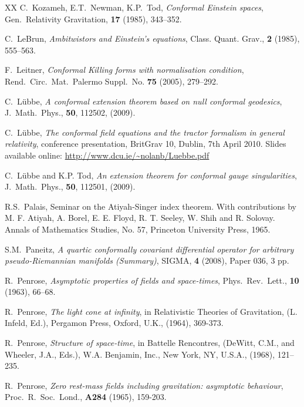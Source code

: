 \documentclass[a4paper,12pt]{amsart}
\theoremstyle{remark}
\begin{document}
\begin{thebibliography}{XX}
 C.\ Kozameh, E.T.\ Newman, K.P.\ Tod, {\em Conformal
  Einstein spaces}, Gen.\ Relativity Gravitation, {\bf 17} (1985),
  343--352.

 C.\ LeBrun, {\em Ambitwistors and Einstein's equations}, 
		Class. Quant. Grav., {\bf 2} (1985), 555--563.

 F.\ Leitner, {\em Conformal Killing forms with
		normalisation condition}, Rend.\ Circ.\ Mat.\ Palermo
		Suppl.\ No. {\bf 75} (2005),  279--292.

 C.\ L\"ubbe, {\em A conformal extension theorem based
  on null conformal geodesics}, J.\ Math.\ Phys., {\bf 50}, 112502,
  (2009).

 C.\ L\"ubbe, {\em The conformal field equations
  and the tractor formalism in general relativity}, conference
  presentation, BritGrav 10, Dublin, 7th April 2010. Slides available
  online: \url{http://www.dcu.ie/~nolanb/Luebbe.pdf}

 C.\ L\"ubbe and K.P. Tod, {\em An extension
  theorem for conformal gauge singularities}, J.\ Math.\ Phys., {\bf 50},
  112501, (2009).


 R.S.\ Palais, Seminar on the Atiyah-Singer index
  theorem. With contributions by M. F. Atiyah, A. Borel, E. E. Floyd,
  R. T. Seeley, W. Shih and R. Solovay. Annals of Mathematics Studies,
  No. 57, Princeton University Press, 1965.

 S.M.\ Paneitz, {\em A quartic conformally covariant
  differential operator for arbitrary pseudo-Riemannian manifolds
  (Summary)}, SIGMA, {\bf 4} (2008), Paper 036, 3 pp.

 R.\ Penrose, {\em Asymptotic
  properties of fields and space-times}, Phys.\ Rev.\ Lett.,
  \textbf{10} (1963), 66--68.

 R.\ Penrose, {\em The light cone at
  infinity}, in Relativistic Theories of Gravitation, (L. Infeld,
  Ed.), Pergamon Press, Oxford, U.K., (1964), 369-373.
		
 R.\ Penrose, {\em Structure of space-time}, in 	
		Battelle Rencontres, (DeWitt, C.M., and Wheeler, J.A., Eds.), 
		W.A. Benjamin, Inc., New York, NY, U.S.A., (1968), 121--235.
		
 R.\ Penrose, {\em Zero rest-mass
  fields including gravitation: asymptotic behaviour},
  Proc.\ R.\ Soc.\ Lond.,  {\bf A284} (1965), 159-203.
		

\end{thebibliography}
\end{document}
